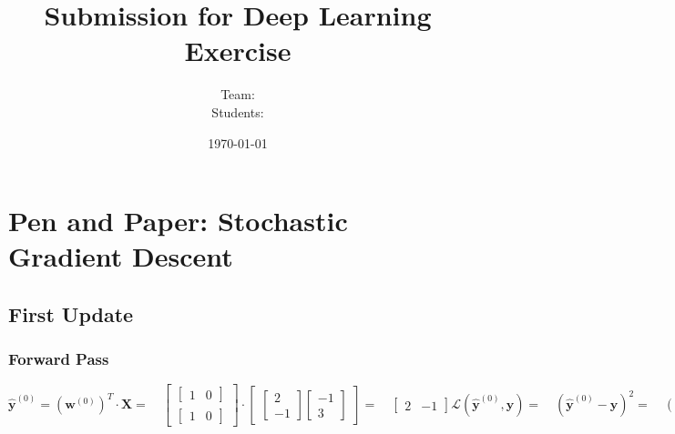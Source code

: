 \documentclass[addpoints]{exam}
\title{Submission for Deep Learning Exercise \assignmentnumber}
\author{Team: \teamname\\Students: \students}
\date{\today}
\begin{document}
    \maketitle


    \section{Pen and Paper: Stochastic Gradient Descent}
    \subsection{First Update}
    	\subsubsection{Forward Pass}
    	\begin{subequations}
    		\begin{equation}
    			\hat{\textbf{y}}^{(0)} = (\textbf{w}^{(0)})^{T}\cdot \textbf{X} = \quad \begin{bmatrix}
    				\begin{bmatrix}
    					1& 0
    				\end{bmatrix} \\
    				\begin{bmatrix}
    					1& 0
    				\end{bmatrix}
    			\end{bmatrix} \cdot \begin{bmatrix}
    				\begin{bmatrix}
    					2 \\-1
    					
    				\end{bmatrix} \begin{bmatrix}
    					-1 \\3
    					
    				\end{bmatrix} 
    			\end{bmatrix}=  \quad \begin{bmatrix}
    			2&-1 
    		\end{bmatrix}
    		\end{equation}
    	\begin{equation}
			\mathscr{L}(\hat{\textbf{y}}^{(0)},\textbf{y}) = \quad (\hat{\textbf{y}}^{(0)} - \textbf{y})^{2} =\quad( \begin{bmatrix}
				2&-1 
			\end{bmatrix} - \begin{bmatrix}
				3&1 
			\end{bmatrix}) ^{2} = \quad \begin{bmatrix}
				1&4 
			\end{bmatrix}
    	\end{equation}
    \end{subequations}
\end{document}
